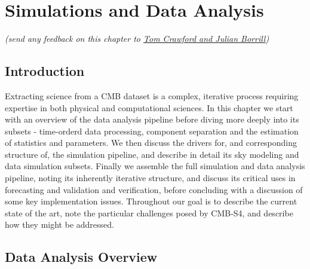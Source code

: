  
\chapter{Simulations and Data Analysis}


\begin{center}
{\it \small (send any feedback on this chapter to \href{mailto:jdborrill@lbl.gov,tcrawfor@kicp.uchicago.edu}{Tom Crawford and Julian Borrill})}
\end{center}


\section{Introduction}

Extracting science from a CMB dataset is a complex, iterative process requiring expertise in both physical and computational sciences. In this chapter we start with an overview of the data analysis pipeline before diving more deeply into its subsets - time-orderd data processing, component separation and the estimation of statistics and parameters. We then discuss the drivers for, and corresponding structure of, the simulation pipeline, and describe in detail its sky modeling and data simulation subsets. Finally we assemble the full simulation and data analysis pipeline, noting its inherently iterative structure, and discuss its critical uses in forecasting and validation and verification, before concluding with a discussion of some key implementation issues. Throughout our goal is to describe the current state of the art, note the particular challenges posed by CMB-S4, and describe how they might be addressed.

\section{Data Analysis Overview}

